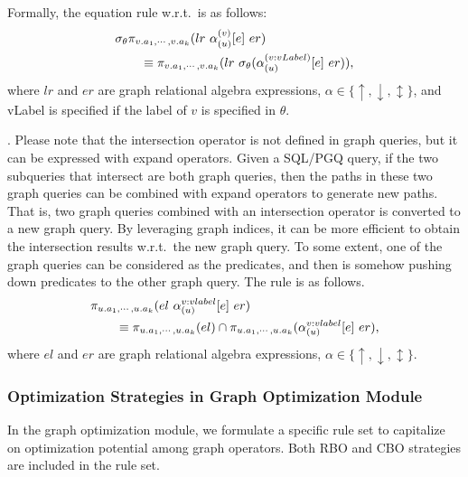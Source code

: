 Formally, the equation rule w.r.t.~\filterrule is as follows:
\begin{equation}
    \begin{split}
    & \sigma_{\theta}\pi_{v.a_1, \cdots, v.a_k}(lr~\alpha_{(u)}^{(v)}[e]~er) \\
    & \hspace*{2em} \equiv \pi_{v.a_1, \cdots, v.a_k}(lr~\sigma_{\theta}(\alpha_{(u)}^{(v:vLabel)}[e]~er)), \\
    \end{split}
\end{equation}
where $lr$ and $er$ are graph relational algebra expressions, $\alpha \in \{\uparrow, \downarrow, \updownarrow\}$, and vLabel is specified if the label of $v$ is specified in $\theta$.


\intersectrule. 
Please note that the intersection operator is not defined in graph queries, but it can be expressed with expand operators.
Given a SQL/PGQ query, if the two subqueries that intersect are both graph queries, then the paths in these two graph queries can be combined with expand operators to generate new paths.
That is, two graph queries combined with an intersection operator is converted to a new graph query.
By leveraging graph indices, it can be more efficient to obtain the intersection results w.r.t.~the new graph query.
To some extent, one of the graph queries can be considered as the predicates, and then \intersectrule is somehow pushing down predicates to the other graph query.
The rule is as follows.
\begin{equation}
    \begin{split}
        & \pi_{u.a_1, \cdots, u.a_k}(el~\alpha_{(u)}^{v:vlabel}[e]~er) \\
        & \hspace*{2em} \equiv \pi_{u.a_1, \cdots, u.a_k}(el) \cap \pi_{u.a_1, \cdots, u.a_k}(\alpha_{(u)}^{v:vlabel}[e]~er),
    \end{split}
\end{equation}
where $el$ and $er$ are graph relational algebra expressions, $\alpha \in \{\uparrow, \downarrow, \updownarrow\}$.



\subsubsection{Optimization Strategies in Graph Optimization Module}

In the graph optimization module, we formulate a specific rule set to capitalize on optimization potential among graph operators. 
Both RBO and CBO strategies are included in the rule set.

